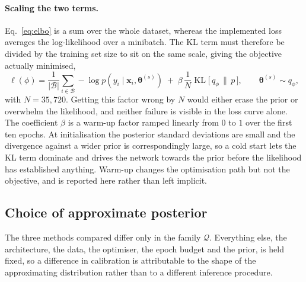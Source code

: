 \documentclass{article}
\begin{document}
\paragraph{Scaling the two terms.}
Eq.~\eqref{eq:elbo} is a sum over the whole dataset, whereas the implemented loss
averages the log-likelihood over a minibatch. The KL term must therefore be
divided by the training set size to sit on the same scale, giving the objective
actually minimised,
\begin{equation}
\ell(\phi) = \frac{1}{|\mathcal{B}|}\sum_{i \in \mathcal{B}}
  -\log p(y_i \mid \mathbf{x}_i, \boldsymbol{\theta}^{(s)})
  \; + \; \beta\,\frac{1}{N}
  \operatorname{KL}\!\big[\, q_\phi \,\|\, p \,\big],
\qquad \boldsymbol{\theta}^{(s)} \sim q_\phi,
\label{eq:vi-loss}
\end{equation}
with $N = 35{,}720$. Getting this factor wrong by $N$ would either erase the
prior or overwhelm the likelihood, and neither failure is visible in the loss
curve alone. The coefficient $\beta$ is a warm-up factor ramped linearly from
$0$ to $1$ over the first ten epochs. At initialisation the posterior standard
deviations are small and the divergence against a wider prior is correspondingly
large, so a cold start lets the KL term dominate and drives the network towards
the prior before the likelihood has established anything. Warm-up changes the
optimisation path but not the objective, and is reported here rather than left
implicit.

\subsection{Choice of approximate posterior}
\label{sec:families}

The three methods compared differ only in the family $\mathcal{Q}$. Everything
else, the architecture, the data, the optimiser, the epoch budget and the prior,
is held fixed, so a difference in calibration is attributable to the shape of the
approximating distribution rather than to a different inference procedure.
\end{document}
